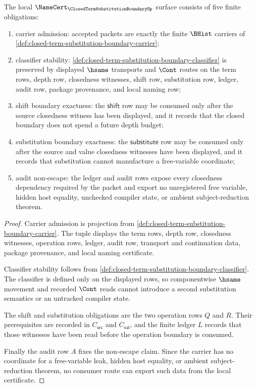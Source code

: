 \begin{theorem}
\label{thm:closed-term-substitution-boundary-namecert-obligations}
The local $\NameCert_{\ClosedTermSubstitutionBoundaryUp}$ surface consists of five finite obligations:
\begin{enumerate}
\item carrier admission: accepted packets are exactly the finite $\BHist$ carriers of \autoref{def:closed-term-substitution-boundary-carrier};
\item classifier stability: \autoref{def:closed-term-substitution-boundary-classifier} is preserved by displayed $\hsame$ transports and $\Cont$ routes on the term rows, depth row, closedness witnesses, shift row, substitution row, ledger, audit row, package provenance, and local naming row;
\item shift boundary exactness: the $\mathsf{shift}$ row may be consumed only after the source closedness witness has been displayed, and it records that the closed boundary does not spend a future depth budget;
\item substitution boundary exactness: the $\mathsf{substitute}$ row may be consumed only after the source and value closedness witnesses have been displayed, and it records that substitution cannot manufacture a free-variable coordinate;
\item audit non-escape: the ledger and audit rows expose every closedness dependency required by the packet and export no unregistered free variable, hidden host equality, unchecked compiler state, or ambient subject-reduction theorem.
\end{enumerate}
\end{theorem}
\begin{proof}
Carrier admission is projection from \autoref{def:closed-term-substitution-boundary-carrier}. The tuple displays the term rows, depth row, closedness witnesses, operation rows, ledger, audit row, transport and continuation data, package provenance, and local naming certificate.

Classifier stability follows from \autoref{def:closed-term-substitution-boundary-classifier}. The classifier is defined only on the displayed rows, so componentwise $\hsame$ movement and recorded $\Cont$ reads cannot introduce a second substitution semantics or an untracked compiler state.

The shift and substitution obligations are the two operation rows $Q$ and $R$. Their prerequisites are recorded in $C_{\mathsf{src}}$ and $C_{\mathsf{val}}$, and the finite ledger $L$ records that those witnesses have been read before the operation boundary is consumed.

Finally the audit row $A$ fixes the non-escape claim. Since the carrier has no coordinate for a free-variable leak, hidden host equality, or ambient subject-reduction theorem, no consumer route can export such data from the local certificate.
\end{proof}

